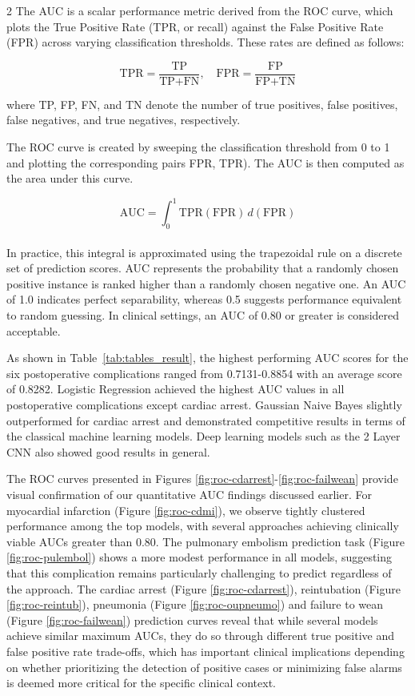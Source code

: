 \documentclass[bst/sn-nature]{sn-jnl}
\begin{document}
\begin{multicols}{2}
\quad The AUC is a scalar performance metric derived from the ROC curve, which plots the True Positive Rate (TPR, or recall) against the False Positive Rate (FPR) across varying classification thresholds. These rates are defined as follows:

\[
\text{TPR} = \frac{\text{TP}}{\text{TP} + \text{FN}}, \quad \text{FPR} = \frac{\text{FP}}{\text{FP} + \text{TN}}
\]

where TP, FP, FN, and TN denote the number of true positives, false positives, false negatives, and true negatives, respectively.

The ROC curve is created by sweeping the classification threshold from 0 to 1 and plotting the corresponding pairs FPR, TPR). The AUC is then computed as the area under this curve.

\[
\text{AUC} = \int_{0}^{1} \text{TPR}(\text{FPR}) \, d(\text{FPR})
\] \\

In practice, this integral is approximated using the trapezoidal rule on a discrete set of prediction scores. AUC represents the probability that a randomly chosen positive instance is ranked higher than a randomly chosen negative one. An AUC of 1.0 indicates perfect separability, whereas 0.5 suggests performance equivalent to random guessing. In clinical settings, an AUC of 0.80 or greater is considered acceptable.

As shown in Table~\ref{tab:tables_result}, the highest performing AUC scores for the six postoperative complications ranged from 0.7131-0.8854 with an average score of 0.8282. Logistic Regression achieved the highest AUC values in all postoperative complications except cardiac arrest. Gaussian Naive Bayes slightly outperformed for cardiac arrest and demonstrated competitive results in terms of the classical machine learning models. Deep learning models such as the 2 Layer CNN also showed good results in general.

The ROC curves presented in Figures \ref{fig:roc-cdarrest}-\ref{fig:roc-failwean} provide visual confirmation of our quantitative AUC findings discussed earlier. For myocardial infarction (Figure \ref{fig:roc-cdmi}), we observe tightly clustered performance among the top models, with several approaches achieving clinically viable AUCs greater than 0.80. The pulmonary embolism prediction task (Figure \ref{fig:roc-pulembol}) shows a more modest performance in all models, suggesting that this complication remains particularly challenging to predict regardless of the approach. The cardiac arrest (Figure \ref{fig:roc-cdarrest}), reintubation (Figure \ref{fig:roc-reintub}), pneumonia (Figure \ref{fig:roc-oupneumo}) and failure to wean (Figure \ref{fig:roc-failwean}) prediction curves reveal that while several models achieve similar maximum AUCs, they do so through different true positive and false positive rate trade-offs, which has important clinical implications depending on whether prioritizing the detection of positive cases or minimizing false alarms is deemed more critical for the specific clinical context.


\end{multicols}
\end{document}
